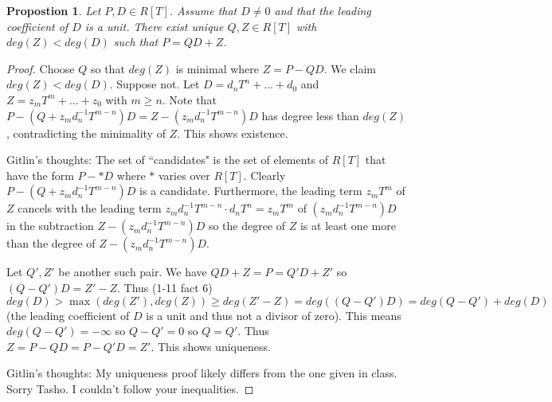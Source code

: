 \documentclass{amsart}
\newtheorem{prop}[thm]{Propostion}
\theoremstyle{definition}
\theoremstyle{remark}
\begin{document}
\begin{prop}
Let $P,D \in R[T]$.  Assume that $D \neq 0$ and that the leading coefficient of $D$ is a unit.  There exist unique $Q,Z \in R[T]$ with $deg(Z) < deg(D)$ such that $P = QD+Z$.
\end{prop}

\begin{proof}\hspace{0.5cm}

Choose $Q$ so that $deg(Z)$ is minimal where $Z = P-QD$.  We claim $deg(Z) < deg(D)$.  Suppose not.  Let $D = d_nT^n + ... + d_0$ and $Z = z_mT^m + ... + z_0$ with $m \geq n$.  Note that $P-(Q+z_md_n^{-1}T^{m-n})D = Z - (z_md_n^{-1}T^{m-n})D$ has degree less than $deg(Z)$, contradicting the minimality of $Z$.  This shows existence.

Gitlin's thoughts:  The set of ``candidates" is the set of elements of $R[T]$ that have the form $P-*D$ where $*$ varies over $R[T]$.  Clearly $P-(Q+z_md_n^{-1}T^{m-n})D$ is a candidate.  Furthermore, the leading term $z_mT^m$ of $Z$ cancels with the leading term $z_md_n^{-1}T^{m-n} \cdot d_nT^n = z_mT^m$ of $(z_md_n^{-1}T^{m-n})D$ in the subtraction $Z - (z_md_n^{-1}T^{m-n})D$ so the degree of $Z$ is at least one more than the degree of $Z - (z_md_n^{-1}T^{m-n})D$.

Let $Q',Z'$ be another such pair.  We have $QD+Z = P = Q'D+Z'$ so $(Q-Q')D = Z'-Z$.  Thus (1-11 fact 6) $deg(D) > \max(deg(Z'),deg(Z)) \geq deg(Z'-Z) = deg((Q-Q')D) = deg(Q-Q') + deg(D)$ (the leading coefficient of $D$ is a unit and thus not a divisor of zero).  This means $deg(Q-Q') = - \infty$ so $Q-Q' = 0$ so $Q= Q'$.  Thus $Z = P-QD = P-Q'D = Z'$.  This shows uniqueness.

Gitlin's thoughts:  My uniqueness proof likely differs from the one given in class.  Sorry Tasho.  I couldn't follow your inequalities.

\end{proof}
\end{document}

